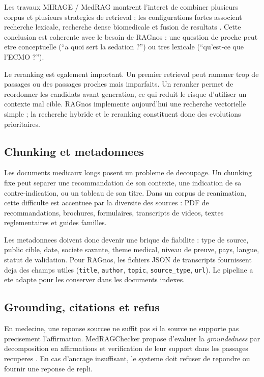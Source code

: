 \documentclass[11pt,a4paper]{article}
\begin{document}
Les travaux MIRAGE / MedRAG montrent l'interet de combiner plusieurs corpus et plusieurs strategies de retrieval ; les configurations fortes associent recherche lexicale, recherche dense biomedicale et fusion de resultats \autocite{mirageMedrag}. Cette conclusion est coherente avec le besoin de RAGnos : une question de proche peut etre conceptuelle (\enquote{a quoi sert la sedation ?}) ou tres lexicale (\enquote{qu'est-ce que l'ECMO ?}).

Le reranking est egalement important. Un premier retrieval peut ramener trop de passages ou des passages proches mais imparfaits. Un reranker permet de reordonner les candidats avant generation, ce qui reduit le risque d'utiliser un contexte mal cible. RAGnos implemente aujourd'hui une recherche vectorielle simple ; la recherche hybride et le reranking constituent donc des evolutions prioritaires.

\subsection{Chunking et metadonnees}

Les documents medicaux longs posent un probleme de decoupage. Un chunking fixe peut separer une recommandation de son contexte, une indication de sa contre-indication, ou un tableau de son titre. Dans un corpus de reanimation, cette difficulte est accentuee par la diversite des sources : PDF de recommandations, brochures, formulaires, transcripts de videos, textes reglementaires et guides familles.

Les metadonnees doivent donc devenir une brique de fiabilite : type de source, public cible, date, societe savante, theme medical, niveau de preuve, pays, langue, statut de validation. Pour RAGnos, les fichiers JSON de transcripts fournissent deja des champs utiles (\texttt{title}, \texttt{author}, \texttt{topic}, \texttt{source\_type}, \texttt{url}). Le pipeline a ete adapte pour les conserver dans les documents indexes.

\subsection{Grounding, citations et refus}

En medecine, une reponse sourcee ne suffit pas si la source ne supporte pas precisement l'affirmation. MedRAGChecker propose d'evaluer la \emph{groundedness} par decomposition en affirmations et verification de leur support dans les passages recuperes \autocite{medRAGChecker}. En cas d'ancrage insuffisant, le systeme doit refuser de repondre ou fournir une reponse de repli.
\end{document}
